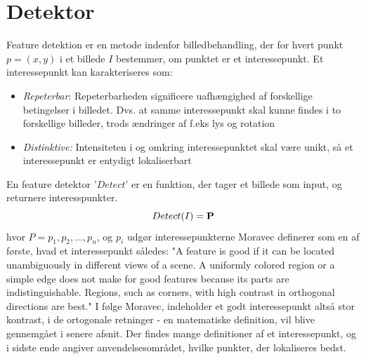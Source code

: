 \section{Detektor}\label{sec:detect}
Feature detektion er en metode indenfor billedbehandling, der for hvert punkt $p = (x,y)$ i et billede $I$ bestemmer, om punktet er et interessepunkt. Et interessepunkt kan karakteriseres som\cite{pointsurvey}:
\begin{itemize}
\item{\emph{Repeterbar}: Repeterbarheden significere uafhængighed af forskellige betingelser i billedet. Dvs. at samme interessepunkt skal kunne findes i to forskellige billeder, trods ændringer af f.eks lys og rotation}
\item{\emph{Distinktive:}
Intensiteten i og omkring interessepunktet skal være unikt, så et interessepunkt er entydigt lokaliserbart}
\end{itemize}
En feature detektor '$Detect$' er en funktion, der tager et billede som input, og returnere interesspunkter.
\begin{equation}
Detect(I)= \bold{P}
\label{detect}
\end{equation}
hvor $P = {p_1, p_2,..., p_n}$, og $p_i$ udgør interessepunkterne
Moravec \cite{moravec} definerer som en af første, hvad et interessepunkt således: "A
feature is good if it can be located unambiguously in different views of a scene. A
uniformly colored region or a simple edge does not make for good features because
its parts are indistinguishable. Regions, such as corners, with high contrast in
orthogonal directions are best." I følge Moravec, indeholder et godt interessepunkt altså stor kontrast, i de ortogonale retninger - en matematiske definition, vil blive gennemgået i senere afsnit. Der findes mange definitioner af et interessepunkt, og i sidste ende angiver anvendelsesområdet, hvilke punkter, der lokaliseres bedst.


